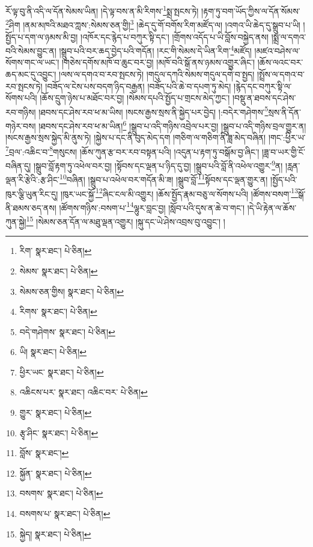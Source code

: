 རོ་ལྟ་བུ་ནི་འདི་ལ་དོན་སེམས་ཡིན། །དེ་ལྟ་བས་ན་མི་རིགས་\footnote{རིག་  སྣར་ཐང་།  པེ་ཅིན། }སྨྲ་སྤངས་ཏེ། །རྟག་ཏུ་བག་ཡོད་ཀྱིས་ལ་དོན་སོམས་\footnote{སེམས་  སྣར་ཐང་།  པེ་ཅིན། }ཤིག །ནམ་མཁའི་མཐའ་ཀླས་:སེམས་ཅན་གྱི།\footnote{སེམས་ཅན་གྱིས།  སྣར་ཐང་།  པེ་ཅིན། } །ཆེད་དུ་གོ་བགོས་རིག་མཛོད་ལ། །འགའ་ཡི་ཆེད་དུ་སྒྲུབ་པ་ཡི། །སྤྱོད་པ་དག་ལ་ཉམས་མི་བྱ། །འཁོར་དང་རྙེད་པ་བཀུར་སྟི་དང་། །གྲོགས་འདོད་པ་ཡི་བློས་བསྐྱེད་ནས། །སྨྲ་ལ་དགའ་བའི་སེམས་བྱུང་ན། །སྒྲུབ་པའི་བར་ཆད་བྱེད་པའི་གདོན། །རང་གི་སེམས་དེ་ཡིན་རིག་\footnote{རིགས་  སྣར་ཐང་།  པེ་ཅིན། }མཛོད། །མཛའ་བཤེས་ལ་སོགས་གང་ལ་ཡང་། །གཅེས་དགོས་མཁོ་བ་ཆུང་བར་བྱ། །མཁོ་བའི་སྒོ་ནས་ཉམས་འགྱུར་ཞིང་། །ཆོས་ལའང་བར་ཆད་མང་དུ་འབྱུང་། །ལས་ལ་དགའ་བ་རབ་སྤངས་ཏེ། །གདུལ་དཀའི་སེམས་གདུལ་དགེ་བ་སྤྱད། །སྤྲོས་ལ་དགའ་བ་རབ་སྤངས་ཏེ། །བཟོད་ལ་ངེས་པས་བདག་ཉིད་བརྒྱན། །བཟོད་པའི་ཆེ་བ་དཔག་ཏུ་མེད། །རྙེད་དང་བཀུར་སྟི་ལ་སོགས་པའི། །ཆོས་དྲུག་ཉེས་པ་མཐོང་བར་བྱ། །སེམས་དཔའི་སྤྱོད་པ་གྲངས་མེད་ཀྱང་། །བསྡུ་ན་ཐབས་དང་ཤེས་རབ་གཉིས། །ཐབས་དང་ཤེས་རབ་ཕ་མ་ཡིས། །སངས་རྒྱས་སྲས་ནི་སྐྱེད་པར་བྱེད། །:བདེར་གཤེགས་\footnote{བདེ་གཤེགས་  སྣར་ཐང་།  པེ་ཅིན། }སྲས་ནི་དོན་གཉེར་བས། །ཐབས་དང་ཤེས་རབ་ཕ་མ་ཡིན།\footnote{ཡི།  སྣར་ཐང་།  པེ་ཅིན། } །སྒྲུབ་པ་འདི་གཉིས་འབྲེལ་པར་བྱ། །སྒྲུབ་པ་འདི་གཉིས་བྲལ་གྱུར་ན། །སངས་རྒྱས་སྲས་སྐྱེད་མི་ནུས་ཏེ། །སྐྱེས་པ་དང་ནི་བུད་མེད་དག །གཅིག་ལ་གཅིག་ནི་ཟླ་མེད་བཞིན། །གང་:ཕྱིར་ཡ་\footnote{ཕྱིར་ཡང་  སྣར་ཐང་།  པེ་ཅིན། }བྲལ་:འཆིང་བ་\footnote{འཆིངས་པར་  སྣར་ཐང་། འཆིང་བར་  པེ་ཅིན། }གསུངས། །ཆོས་ཀུན་རྩ་བར་རབ་བསྟན་པའི། །འདུན་པ་རྟག་ཏུ་བསྒོམ་བྱ་ཞིང་། །ཟླ་བ་ཡར་གྱི་ངོ་བཞིན་དུ། །སྒྲུབ་བློ་རྟག་ཏུ་འཕེལ་བར་བྱ། །སྟོབས་དང་ལྡན་པ་ཉིད་དུ་བྱ། །སྒྲུབ་པའི་བློ་ནི་འཕེལ་འགྱུར་\footnote{གྱུར་  སྣར་ཐང་།  པེ་ཅིན། }ན། །རླན་ལྡན་རི་རྩེའི་:རྩ་ཤིང་\footnote{རྩྭ་ཤིང་  སྣར་ཐང་།  པེ་ཅིན། }བཞིན། །སྒྲུབ་པ་འཕེལ་བར་གདོན་མི་ཟ། །སྒྲུབ་བློ་\footnote{བློས་  སྣར་ཐང་། }སྟོབས་དང་ལྡན་གྱུར་ན། །སྤྱོད་པའི་ཁུར་ལྕི་ཡུན་རིང་དུ། །ཁུར་ཡང་སྐྱོ་\footnote{སྐྱོན་  སྣར་ཐང་།  པེ་ཅིན། }ཞིང་ངལ་མི་འགྱུར། །ཆོས་སྤྱོད་རྣམ་བཅུ་ལ་སོགས་པའི། །ཚོགས་བསག་\footnote{བསགས་  སྣར་ཐང་།  པེ་ཅིན། }སྒོ་ནི་ཐམས་ཅད་ནས། །ཚོགས་གཉིས་:བསག་པ་\footnote{བསགས་པ་  སྣར་ཐང་།  པེ་ཅིན། }ལྷུར་བླང་བྱ། །སློབ་པའི་དུས་ན་ཆེ་བ་གང་། །དེ་ཡི་རྟེན་ལ་ཆོས་ཀུན་སྐྱེ།\footnote{སྐྱེད།  སྣར་ཐང་།  པེ་ཅིན། } །སེམས་ཅན་དོན་ལ་མཐུ་ལྡན་འགྱུར། །སྐུ་དང་ཡེ་ཤེས་འབྲས་བུ་འབྱུང་། །
